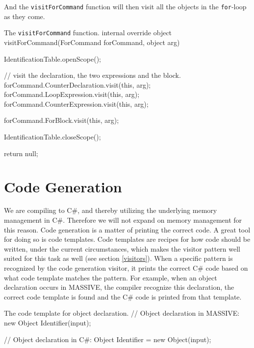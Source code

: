 And the \texttt{visitForCommand} function will then visit all the objects in the \texttt{for}-loop as they come.
\newline
\begin{source}{The \texttt{visitForCommand} function.}{}
internal override object visitForCommand(ForCommand forCommand, object arg)
		{
				IdentificationTable.openScope();

        // visit the declaration, the two expressions and the block.
        forCommand.CounterDeclaration.visit(this, arg);
        forCommand.LoopExpression.visit(this, arg);
        forCommand.CounterExpression.visit(this, arg);

        forCommand.ForBlock.visit(this, arg);

        IdentificationTable.closeScope();
						
        return null;
    }
\end{source}

\section{Code Generation}
We are compiling to C\#, and thereby utilizing the underlying memory management in C\#. Therefore we will not expand on memory management for this reason.
Code generation is a matter of printing the correct code. \newline
A great tool for doing so is code templates. 
Code templates are recipes for how code should be written, under the current circumstances, which makes the visitor pattern well suited for this task as well (see section \ref{visitors}).\newline
When a specific pattern is recognized by the code generation visitor, it prints the correct C\# code based on what code template matches the pattern. 
For example, when an object declaration occurs in MASSIVE, the compiler recognize this declaration, the correct code template is found and the C\# code is printed from that template. \newline

\begin{source}{The code template for object declaration.}{}
// Object declaration in MASSIVE:
new Object Identifier(input);

// Object declaration in C#:
Object Identifier = new Object(input);
\end{source}